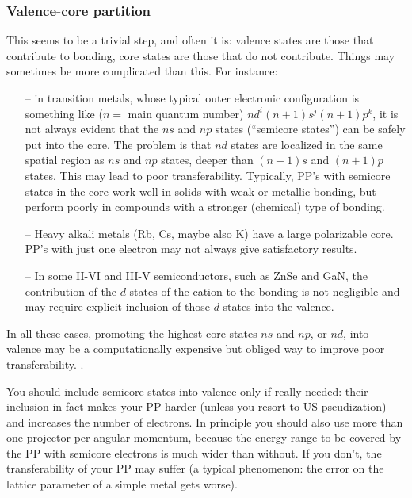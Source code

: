 \documentclass[12pt]{article}
\begin{document}
\subsubsection{Valence-core partition}
\label{ValCore}
This seems to be a trivial step, and often it is: valence states 
are those that contribute to bonding, core states are those that 
do not contribute. Things may sometimes be more complicated than 
this. For instance:
\begin{enumerate}
\item[--] in transition metals, whose typical outer electronic
configuration is something like ($n=$ main quantum number)
$nd^i(n+1)s^j(n+1)p^k$, it is not
always evident that the $ns$ and $np$ states (``semicore states'')
can be safely put into the core. The problem is that $nd$ states 
are localized in the same spatial region as $ns$ and $np$ states, 
deeper than $(n+1)s$ and $(n+1)p$ states. This may lead to poor 
transferability. Typically, PP's with semicore states in the core 
work well in solids with weak or metallic bonding, but perform poorly 
in compounds with a stronger (chemical) type of bonding.
\item[--] Heavy alkali metals (Rb, Cs, maybe also K) have a large
polarizable core. PP's with just one electron may not always give
satisfactory results.
\item[--] In some II-VI and III-V semiconductors, such as ZnSe and
GaN, the contribution of the $d$ states of the cation to the bonding 
is not negligible and may require explicit inclusion of those $d$ 
states into the valence.
\end{enumerate}
In all these cases, promoting the highest core states $ns$ and $np$,
or $nd$, into valence may be a computationally
expensive but obliged way to improve poor transferability. . 

You should include semicore states into valence only if really needed:
their inclusion in fact makes your PP harder (unless you resort to 
US pseudization) and increases the number of electrons. In principle 
you should also use more than one projector per angular momentum, 
because the energy range to be covered by the PP with semicore electrons 
is much wider than without. If you don't, the transferability of your PP 
may suffer (a typical phenomenon:
the error on the lattice parameter of a simple metal gets worse).
\end{document}
